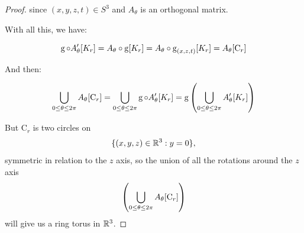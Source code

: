\begin{proof}
since $(x,y,z,t) \in S^3$ and $A_{\theta}$ is an orthogonal matrix.

With all this, we have:

\begin{equation*}
    \operatorname{g} \circ A'_{\theta}[K_{r}] = A_{\theta} \circ \operatorname{g}[K_{r}] = A_{\theta} \circ \operatorname{g}_{(x,z,t)}[K_{r}] = A_{\theta}[\operatorname{C}_{r}]
\end{equation*}

And then:

\begin{equation*}
    \bigcup\limits_{0 \leq \theta \leq 2\pi} A_{\theta}[\operatorname{C}_{r}] = \bigcup\limits_{0 \leq \theta \leq 2\pi} \operatorname{g} \circ A'_{\theta}[K_{r}] = \operatorname{g}\left(\bigcup\limits_{0 \leq \theta \leq 2\pi} A'_{\theta}[K_{r}]\right)
\end{equation*}

But C$_{r}$ is two circles on 
\begin{equation*}
\{(x,y,z) \in \mathbb{R}^3 : y = 0\},    
\end{equation*}
symmetric in relation to the $z$ axis, so the union of all the rotations around the $z$ axis 
\begin{equation*}
    \left(\bigcup\limits_{0 \leq \theta \leq 2\pi} A_{\theta}[\operatorname{C}_{r}]\right)
\end{equation*}
will give us a ring torus in $\mathbb{R}^3$.


\end{proof}
